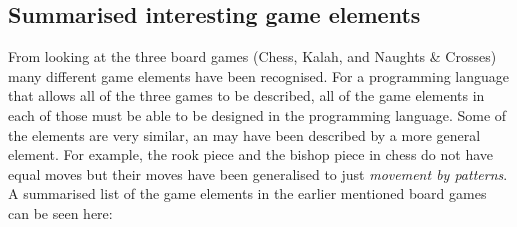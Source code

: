 \subsection{Summarised interesting game elements}
\label{subsec:differences}
From looking at the three board games (Chess, Kalah, and Naughts \& Crosses) many different game elements have been recognised. For a programming language that allows all of the three games to be described, all of the game elements in each of those must be able to be designed in the programming language. Some of the elements are very similar, an may have been described by a more general element. For example, the rook piece and the bishop piece in chess do not have equal moves but their moves have been generalised to just \textit{movement by patterns}. A summarised list of the game elements in the earlier mentioned board games can be seen here:
